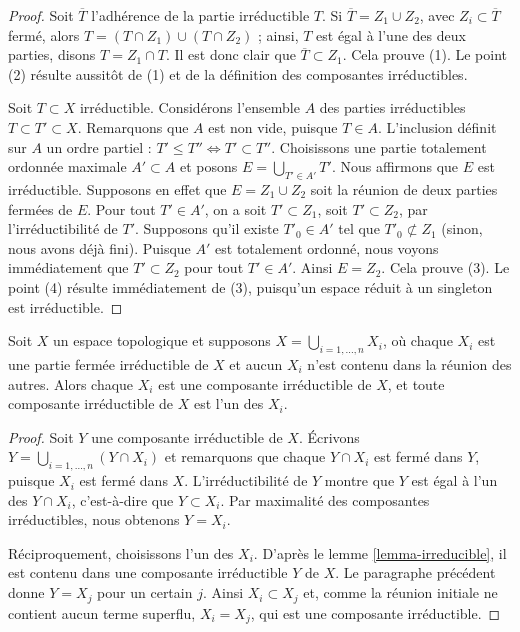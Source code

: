 \begin{proof}
Soit $\overline{T}$ l'adhérence de la partie irréductible $T$.
Si $\overline{T} = Z_1 \cup Z_2$, avec $Z_i \subset \overline{T}$ fermé,
alors $T = (T\cap Z_1) \cup (T \cap Z_2)$ ; ainsi, $T$ est égal à l'une des
deux parties, disons $T = Z_1 \cap T$. Il est donc clair que
$\overline{T} \subset Z_1$. Cela prouve (1). Le point (2) résulte aussitôt de
(1) et de la définition des composantes irréductibles.

\medskip\noindent
Soit $T \subset X$ irréductible. Considérons l'ensemble $A$ des parties
irréductibles $T \subset T' \subset X$. Remarquons que $A$ est non vide,
puisque $T \in A$. L'inclusion définit sur $A$ un ordre partiel :
$T' \leq T'' \Leftrightarrow T' \subset T''$.
Choisissons une partie totalement ordonnée maximale $A' \subset A$ et posons
$E = \bigcup_{T' \in A'} T'$. Nous affirmons que $E$ est irréductible.
Supposons en effet que $E =  Z_1 \cup Z_2$ soit la réunion de deux parties
fermées de $E$. Pour tout $T' \in A'$, on a soit $T' \subset Z_1$, soit
$T' \subset Z_2$, par l'irréductibilité de $T'$. Supposons qu'il existe
$T'_0 \in A'$ tel que $T'_0 \not\subset Z_1$ (sinon, nous avons déjà fini).
Puisque $A'$ est totalement ordonné, nous voyons immédiatement que
$T' \subset Z_2$ pour tout $T' \in A'$. Ainsi $E = Z_2$.
Cela prouve (3). Le point (4) résulte immédiatement de (3), puisqu'un espace
réduit à un singleton est irréductible.
\end{proof}

\begin{lemma}
\label{lemma-pick-irreducible-components}
Soit $X$ un espace topologique et supposons
$X = \bigcup_{i = 1, \ldots, n} X_i$, où chaque $X_i$ est une partie fermée
irréductible de $X$ et aucun $X_i$ n'est contenu dans la réunion des autres.
Alors chaque $X_i$ est une composante irréductible de $X$, et toute composante
irréductible de $X$ est l'un des $X_i$.
\end{lemma}

\begin{proof}
Soit $Y$ une composante irréductible de $X$. Écrivons
$Y = \bigcup_{i = 1, \ldots, n} (Y \cap X_i)$ et remarquons que chaque
$Y \cap X_i$ est fermé dans $Y$, puisque $X_i$ est fermé dans $X$.
L'irréductibilité de $Y$ montre que $Y$ est égal à l'un des $Y \cap X_i$,
c'est-à-dire que $Y \subset X_i$. Par maximalité des composantes
irréductibles, nous obtenons $Y = X_i$.

\medskip\noindent
Réciproquement, choisissons l'un des $X_i$. D'après le lemme
\ref{lemma-irreducible}, il est contenu dans une composante irréductible $Y$
de $X$. Le paragraphe précédent donne $Y = X_j$ pour un certain $j$.
Ainsi $X_i \subset X_j$ et, comme la réunion initiale ne contient aucun terme
superflu, $X_i = X_j$, qui est une composante irréductible.
\end{proof}

